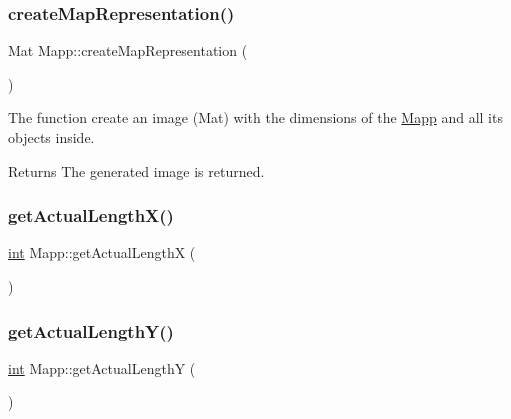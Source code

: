\subsubsection{\texorpdfstring{createMapRepresentation()}{createMapRepresentation()}}
{\footnotesize\ttfamily Mat Mapp\+::create\+Map\+Representation (\begin{DoxyParamCaption}{ }\end{DoxyParamCaption})}



The function create an image (Mat) with the dimensions of the \mbox{\hyperlink{class_mapp}{Mapp}} and all its objects inside. 

\begin{DoxyReturn}{Returns}
The generated image is returned. 
\end{DoxyReturn}
\mbox{\label{class_mapp_acb069278e8bc828245eae0092ae8efb2}} 
\subsubsection{\texorpdfstring{getActualLengthX()}{getActualLengthX()}}
{\footnotesize\ttfamily \mbox{\hyperlink{draw_8hh_aa620a13339ac3a1177c86edc549fda9b}{int}} Mapp\+::get\+Actual\+LengthX (\begin{DoxyParamCaption}{ }\end{DoxyParamCaption})\hspace{0.3cm}{\ttfamily [inline]}}

\mbox{\label{class_mapp_ac22e58e9558eeb4fda02318589f2e300}} 
\subsubsection{\texorpdfstring{getActualLengthY()}{getActualLengthY()}}
{\footnotesize\ttfamily \mbox{\hyperlink{draw_8hh_aa620a13339ac3a1177c86edc549fda9b}{int}} Mapp\+::get\+Actual\+LengthY (\begin{DoxyParamCaption}{ }\end{DoxyParamCaption})\hspace{0.3cm}{\ttfamily [inline]}}

\mbox{\label{class_mapp_a9c285cae4a8913b851fa88df2bbfba67}} 
